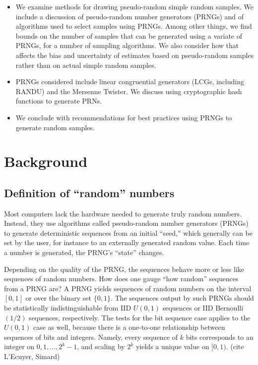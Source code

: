\documentclass[12pt]{article}
\begin{document}
\begin{itemize}
\item We examine methods for drawing pseudo-random simple random samples. 
We include a discussion of pseudo-random number generators (PRNGs) and 
of algorithms used to select samples using PRNGs.
Among other things, we find bounds on the number of samples that can be generated 
using a variate of PRNGs, for a number of sampling algorithms. 
We also consider how that affects the bias and uncertainty of estimates based on pseudo-random
samples rather than on actual simple random samples.
\item PRNGs considered include linear congruential generators (LCGs, including RANDU)
and the Mersenne Twister. We discuss using cryptographic hash functions to generate PRNs.
\item We conclude with recommendations for best practices using PRNGs to generate random samples.
\end{itemize}



\section{Background}
\subsection{Definition of ``random'' numbers}
Most computers lack the hardware needed to generate truly random numbers. 
Instead, they use algorithms called pseudo-random number generators (PRNGs) to generate
deterministic sequences from an initial ``seed,'' which generally can be set by the user,
for instance to an externally generated random value.
Each time a number is generated, the PRNG's ``state'' changes.

Depending on the quality of the PRNG, the sequences behave more or less like sequences of random numbers.
How does one gauge ``how random'' sequences from a PRNG are?
A PRNG yields sequences of random numbers on the interval $[0, 1]$ or over the binary set $\{0, 1\}$.
The sequences output by such PRNGs should be statistically indistinguishable from IID $U(0,1)$ sequences or
IID Bernoulli$(1/2)$ sequences, respectively.
The tests for the bit sequence case applies to the $U(0,1)$ case as well, because there is a one-to-one relationship
between sequences of bits and integers.
Namely, every sequence of $k$ bits corresponds to an integer on $0, 1, \dots, 2^k-1$, and scaling by $2^k$
yields a unique value on $[0, 1)$. (cite L'Ecuyer, Simard)
\end{document}
